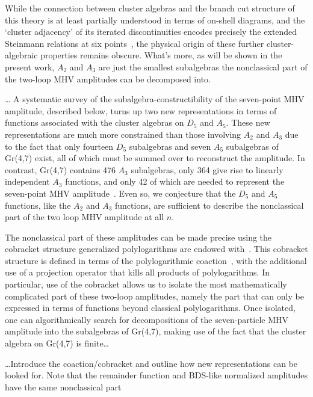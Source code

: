 \documentclass[11pt]{article}
\begin{document}
While the connection between cluster algebras and the branch cut structure of this theory is at least partially understood in terms of on-shell diagrams, and the `cluster adjacency' of its iterated discontinuities encodes precisely the extended Steinmann relations at six points~\cite{Caron-Huot:2018dsv,cosmic_galois_paper}, the physical origin of these further cluster-algebraic properties remains obscure. What's more, as will be shown in the present work, $A_2$ and $A_3$ are just the smallest subalgebras the nonclassical part of the two-loop MHV amplitudes can be decomposed into. 

\dots
A systematic survey of the subalgebra-constructibility of the seven-point MHV amplitude, described below, turns up two new representations in terms of functions associated with the cluster algebras on $D_5$ and $A_5$. These new representations are much more constrained than those involving $A_2$ and $A_3$ due to the fact that only fourteen $D_5$ subalgebras and seven $A_5$ subalgebras of Gr(4,7) exist, all of which must be summed over to reconstruct the amplitude. In contrast, Gr(4,7) contains 476 $A_3$ subalgebras, only 364 give rise to linearly independent $A_3$ functions, and only 42 of which are needed to represent the seven-point MHV amplitude~\cite{Golden:2014xqa}.  Even so, we conjecture that the $D_5$ and $A_5$ functions, like the $A_2$ and $A_3$ functions, are sufficient to describe the nonclassical part of the two loop MHV amplitude at all $n$.

The nonclassical part of these amplitudes can be made precise using the cobracket structure generalized polylogarithms are endowed with~\cite{}. This cobracket structure is defined in terms of the polylogarithmic coaction~\cite{}, with the additional use of a projection operator that kills all products of polylogarithms. In particular, use of the cobracket allows us to isolate the most mathematically complicated part of these two-loop amplitudes, namely the part that can only be expressed in terms of functions beyond classical polylogarithms. Once isolated, one can algorithmically search for decompositions of the seven-particle MHV amplitude into the subalgebras of Gr(4,7), making use of the fact that the cluster algebra on Gr(4,7) is finite\dots

\dots Introduce the coaction/cobracket and outline how new representations can be looked for. Note that the remainder function and BDS-like normalized amplitudes have the same nonclassical part
\end{document}
